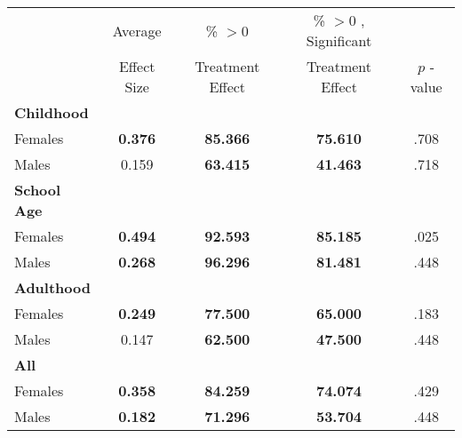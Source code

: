 \begin{tabular}{l c c c c}
\toprule
 & Average & \% $ >0 $ & \% $ >0 $ , Significant & \citet{Rosenbaum_2005_Distribution_JRSS} \\
 & Effect Size & Treatment Effect & Treatment Effect & $ p $ -value \\
\midrule
\textbf{Childhood} & & & & \\
\quad Females &  \textbf{    0.376} & \textbf{   85.366} & \textbf{   75.610} & .708 \\
\quad Males &      0.159 & \textbf{   63.415} & \textbf{   41.463} & .718 \\
\midrule
\textbf{School Age} & & & & \\
\quad Females &  \textbf{    0.494} & \textbf{   92.593} & \textbf{   85.185} & .025 \\
\quad Males &  \textbf{    0.268} & \textbf{   96.296} & \textbf{   81.481} & .448 \\
\midrule
\textbf{Adulthood} & & & & \\
\quad Females &  \textbf{    0.249} & \textbf{   77.500} & \textbf{   65.000} & .183 \\
\quad Males &      0.147 & \textbf{   62.500} & \textbf{   47.500} & .448 \\
\midrule
\textbf{All} & & & & \\
\quad Females &  \textbf{    0.358} & \textbf{   84.259} & \textbf{   74.074} & .429 \\
\quad Males &  \textbf{    0.182} & \textbf{   71.296} & \textbf{   53.704} & .448 \\
\bottomrule
\end{tabular}
